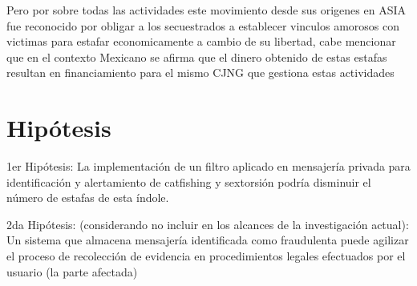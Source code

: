 \documentclass{article}
\begin{document}
Pero por sobre todas las actividades este movimiento desde sus origenes en ASIA fue reconocido por obligar a los secuestrados a establecer vinculos amorosos con victimas para estafar economicamente a cambio de su libertad, cabe mencionar que en el contexto Mexicano se afirma que el dinero obtenido de estas estafas resultan en financiamiento para el mismo CJNG que gestiona estas actividades
\cite{milenio2024cjng}


\section{Hipótesis}

1er Hipótesis: La implementación de un filtro aplicado en mensajería privada para identificación y alertamiento de catfishing y sextorsión podría disminuir el número de estafas de esta índole.

2da Hipótesis: (considerando no incluir en los alcances de la investigación actual): Un sistema que almacena mensajería identificada como fraudulenta puede agilizar el proceso de recolección de evidencia en procedimientos legales efectuados por el usuario (la parte afectada)
\end{document}
